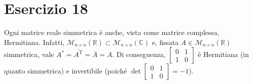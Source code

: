 \documentclass{article}
\newcommand*{\M}[3]{\mathcal{M}_{#1\times#2} \left(#3\right)}
\newcommand*{\MR}[2]{\M{#1}{#2}{\mathbb{R}}}
\newcommand*{\MC}[2]{\M{#1}{#2}{\mathbb{C}}}
\newcommand*{\T}[1]{{#1}^\text{T}}  %
\newcommand*{\m}[1]{\begin{bmatrix}#1\end{bmatrix}}
\begin{document}
\section*{Esercizio 18}
Ogni matrice reale simmetrica è anche, vista come matrice complessa, Hermitiana.
Infatti, $\MR{n}{n}\subset\MC{n}{n}$ e,
fissata $A\in\MR{n}{n}$ simmetrica, vale
$A^* = \overline{\T{A}} = \overline{A} = A$.
Di conseguenza, $\m{ 0 & 1 \\ 1 & 0 }$ è
Hermitiana (in quanto simmetrica) e invertibile
(poiché $\det\m{ 0 & 1 \\ 1 & 0 } = -1$).
\end{document}
